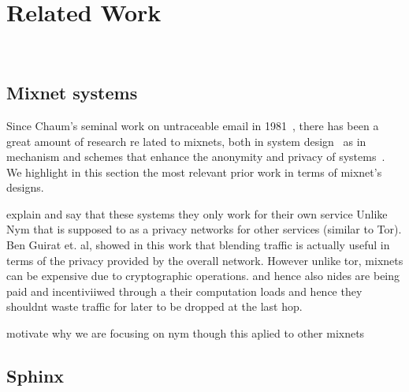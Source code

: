 \section{Related Work}~\label{sec:related}
\subsection{Mixnet systems}
Since Chaum’s seminal work on untraceable email in 1981~\cite{chaum-mix}, there has been a great amount of research re
lated to mixnets, both in system design~\cite{piotrowska2017loopix, van2015vuvuzela, kwon2020xrd, lazar2018karaoke} as in mechanism and schemes that enhance the anonymity and privacy of systems~\cite{coconut, benguirat2023blending}. We highlight in this section the most relevant prior work in terms of mixnet's designs.


explain and say that these systems they only work for their own service Unlike Nym that is supposed to as a privacy networks for other services (similar to Tor). Ben Guirat et. al, showed in this work that blending traffic is actually useful in terms of the privacy provided by the overall network.
However unlike tor, mixnets can be expensive due to cryptographic operations.
and hence
also nides are being paid and incentiviiwed through a their computation loads and hence they shouldnt waste traffic for later to be dropped at the last hop.
 
motivate why we are focusing on nym though this aplied to other mixnets
\subsection{Sphinx}
